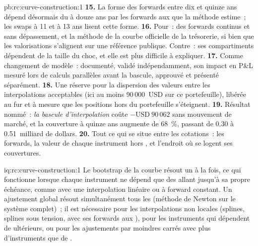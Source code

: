 \begin{solution}{pb:rc:curve-construction:1}
\textbf{15.} La forme des forwards entre dix et quinze ans dépend désormais du  à douze ans
par les forwards aux  que la méthode estime~; les swaps à 11
et à 13 ans lisent cette forme.
\textbf{16.} Pour~: des forwards continus et sans dépassement, et la méthode de la courbe
officielle de la trésorerie, si bien que les valorisations s'alignent sur une référence publique.
Contre~: ses compartiments dépendent de la taille du choc, et elle est plus difficile à expliquer.
\textbf{17.} Comme changement de modèle~: documenté, validé indépendamment, son impact en P\&L
mesuré lors de calculs parallèles avant la bascule, approuvé et
présenté séparément.
\textbf{18.} Une réserve pour la dispersion des valeurs entre les interpolations acceptables
(ici au moins 90\,000~USD sur ce portefeuille), libérée au fur et à mesure
que les positions hors  du portefeuille s'éteignent.
\textbf{19.} Résultat nommé~: \emph{la bascule d'interpolation} coûte
$-\text{USD}~90\,062$ sans mouvement de marché, et la couverture à quinze ans augmente de
68~\%, passant de 0.30 à 0.51~milliard de dollars.
\textbf{20.} Tout ce qui se situe entre les cotations~: les forwards, la valeur de chaque
instrument hors , et l'endroit où se logent ses couvertures.
\end{solution}

\begin{solution}{iq:rc:curve-construction:1}
Le bootstrap de la courbe résout un  à la fois, ce qui fonctionne lorsque chaque
instrument ne dépend que des  allant jusqu'à sa propre échéance, comme avec une
interpolation linéaire ou à forward constant. Un ajustement global résout simultanément tous les  (méthode de Newton
sur le système complet)~; il est nécessaire pour les interpolations non locales (splines,
splines sous tension,  avec ses forwards aux ), pour les instruments qui
dépendent de  ultérieurs, ou pour les ajustements par moindres carrés avec plus d'instruments que
de .
\end{solution}

